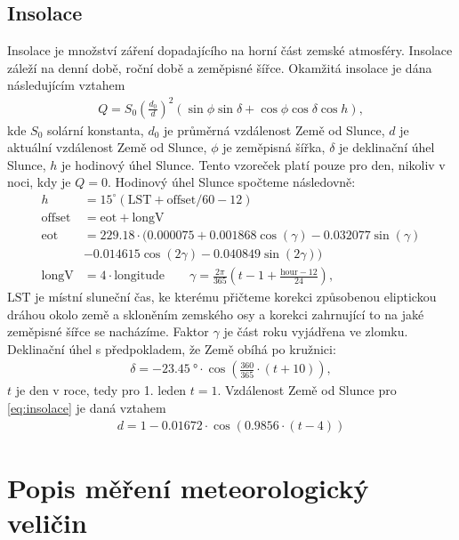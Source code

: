 \subsection{Insolace}\label{chap:insolation}
Insolace je množství záření dopadajícího na horní část zemské atmosféry. Insolace záleží na denní době, roční době a zeměpisné šířce. Okamžitá insolace je dána následujícím vztahem \parencite{insolace}
\begin{gather}\label{eq:insolace}
Q = S_0\left(\frac{d_0}{d}\right)^2\left(\sin\phi\sin\delta + \cos\phi\cos\delta\cos h\right),
\end{gather}
kde $S_0$ solární konstanta, $d_0$ je průměrná vzdálenost Země od Slunce, $d$ je aktuální vzdálenost Země od Slunce, $\phi$ je zeměpisná šířka, $\delta$ je deklinační úhel Slunce, $h$ je hodinový úhel Slunce. Tento vzoreček platí pouze pro den, nikoliv v noci, kdy je $Q=0$. Hodinový úhel Slunce spočteme následovně: \parencite{hourangle}
\begin{equation}
	\begin{split}
		h &= 15^{\circ}\left(\text{LST}+\text{offset}/60-12\right)\\
		\text{offset} &= \text{eot} + \text{longV}\\
		\text{eot} &= 229.18\cdot(0.000075+0.001868\cos(\gamma)-0.032077\sin(\gamma)\\
		& -0.014615\cos(2\gamma)-0.040849\sin(2\gamma))\\
		\text{longV} &= 4\cdot\text{longitude}\qquad \gamma = \frac{2\pi}{365}\left(t - 1 + \frac{\text{hour}-12}{24}\right),
	\end{split}
\end{equation}
$\text{LST}$ je místní sluneční čas, ke kterému přičteme korekci způsobenou eliptickou dráhou okolo země a skloněním zemského osy a korekci zahrnující to na jaké zeměpisné šířce se nacházíme. Faktor $\gamma$ je část roku vyjádřena ve zlomku.
Deklinační úhel s předpokladem, že Země obíhá po kružnici: \parencite{declinationangle}
\begin{gather*}
\delta = \SI{-23.45}{\degree} \cdot \cos\left(\frac{360}{365}\cdot(t+10)\right),
\end{gather*}
$t$ je den v roce, tedy pro 1. leden $t=1$. Vzdálenost Země od Slunce pro \eqref{eq:insolace} je daná vztahem \parencite{sunearthdist}
\begin{gather*}
d = 1-0.01672\cdot \cos\left(0.9856\cdot(t-4)\right)
\end{gather*}


\section{Popis měření meteorologický veličin} \label{chap:measure}
